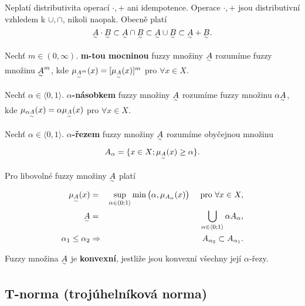 {\begin{remark}
Neplatí distributivita operací $\cdot, +$ ani idempotence. Operace $\cdot, +$ jsou distributivní vzhledem k $\cup, \cap$, nikoli naopak. Obecně platí
\begin{equation*}
\underset{^\sim}A \cdot \underset{^\sim}B \subset \underset{^\sim}A \cap \underset{^\sim}B \subset \underset{^\sim}A \cup \underset{^\sim}B \subset \underset{^\sim}A + \underset{^\sim}B.
\end{equation*}
\end{remark}

\begin{definition}
Nechť $m \in (0, \infty)$. \textbf{m-tou mocninou} fuzzy množiny $\underset{^\sim}A$ rozumíme fuzzy množinu $\underset{^\sim}A^m$, kde $\mu_{\underset{^\sim}A^m}(x)=[\mu_{\underset{^\sim}A}(x)]^m$ pro $\forall x \in X$.
\end{definition}

\begin{definition}
Nechť $\alpha \in \langle 0, 1 \rangle$. {\boldmath$\alpha$}\textbf{-násobkem} fuzzy množiny $\underset{^\sim}A$ rozumíme fuzzy množinu $\alpha\underset{^\sim}A$, kde $\mu_{\alpha\underset{^\sim}A}(x)=\alpha\mu_{\underset{^\sim}A}(x)$ pro $\forall x \in X$.
\end{definition}

\begin{definition}
Nechť $\alpha \in \langle 0, 1 \rangle$. {\boldmath$\alpha$}\textbf{-řezem} fuzzy množiny $\underset{^\sim}A$ rozumíme obyčejnou množinu
\begin{equation*}
A_{\alpha} = \lbrace x \in X; \mu_{\underset{^\sim}A}(x) \geq \alpha \rbrace.
\end{equation*}
\end{definition}

\begin{theorem}
Pro libovolné fuzzy množiny $\underset{^\sim}A$ platí
\begin{eqnarray*}
\mu_{\underset{^\sim}A}(x) &=& \sup_{\substack{\alpha \in (0;1\rangle}} \min \big(\alpha, \mu_{A_{\alpha}}(x)\big) \quad \text{ pro } \forall x \in X, \\
\underset{^\sim}A &=& \bigcup\limits_{\alpha \in \langle 0;1 \rangle} \alpha A_{\alpha}, \\
\alpha_1 \leq \alpha_2 &\Rightarrow& A_{\alpha_2} \subset A_{\alpha_1}.
\end{eqnarray*}
\end{theorem}

\begin{definition}
Fuzzy množina $\underset{^\sim}A$ je \textbf{konvexní}, jestliže jsou konvexní všechny její $\alpha$-řezy.
\end{definition}

\subsection{T-norma (trojúhelníková norma)}

}
